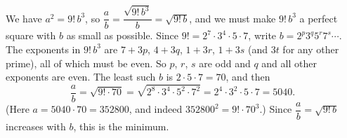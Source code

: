 We have $a^2=9!\,b^3$, so $\dfrac{a}{b}=\dfrac{\sqrt{9!\,b^3}}{b}=\sqrt{9!\,b}$, and we must make $9!\,b^3$ a perfect square with $b$ as small as possible. Since $9!=2^7\cdot3^4\cdot5\cdot7$, write $b=2^p3^q5^r7^s\cdots$. The exponents in $9!\,b^3$ are $7+3p$, $4+3q$, $1+3r$, $1+3s$ (and $3t$ for any other prime), all of which must be even. So $p$, $r$, $s$ are odd and $q$ and all other exponents are even. The least such $b$ is $2\cdot5\cdot7=70$, and then
\[
\dfrac{a}{b}=\sqrt{9!\cdot70}=\sqrt{2^8\cdot3^4\cdot5^2\cdot7^2}=2^4\cdot3^2\cdot5\cdot7=\boxed{5040}.
\]
(Here $a=5040\cdot70=352800$, and indeed $352800^2=9!\cdot70^3$.) Since $\dfrac{a}{b}=\sqrt{9!\,b}$ increases with $b$, this is the minimum.
